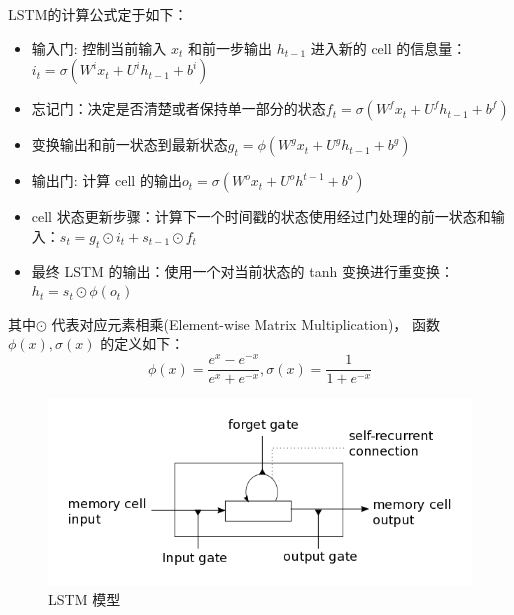 \documentclass[12pt,a4paper]{article}
\begin{document}
LSTM的计算公式定于如下：
\begin{itemize}
\item 输入门: 控制当前输入 $x_t$ 和前一步输出 $h_{t−1}$ 进入新的 cell 的信息量：$i_t=\sigma(W^i x_t+U^i h_{t-1}+b^i)$
\item  忘记门：决定是否清楚或者保持单一部分的状态$f_t=\sigma(W^f x_t+U^f h_{t-1}+b^f)$
\item  变换输出和前一状态到最新状态$g_t=\phi(W^g x_t+U^g h_{t-1}+b^g)$
\item  输出门: 计算 cell 的输出$o_t=\sigma(W^o x_t+U^o h^{t-1}+b^o)$
\item  cell 状态更新步骤：计算下一个时间戳的状态使用经过门处理的前一状态和输入：$s_t=g_t\odot i_t+s_{t-1}\odot f_t$
\item  最终 LSTM 的输出：使用一个对当前状态的 tanh 变换进行重变换：$h_t=s_t\odot \phi(o_t)$
\end{itemize}
其中$\odot$ 代表对应元素相乘(Element-wise Matrix Multiplication)， 函数 $\phi(x), \sigma(x)$ 的定义如下：
\begin{equation}\label{equ:tanh}
  \phi(x)=\frac{e^x-e^{-x}}{e^x+e^{-x}},\sigma(x)=\frac{1}{1+e^{-x}}
\end{equation}

\begin{figure}
  \centering
  \includegraphics[width=0.7\linewidth]{./figures/lstm_memorycell}
  \caption{LSTM 模型}\label{fig:lstm}
\end{figure}
\end{document}
